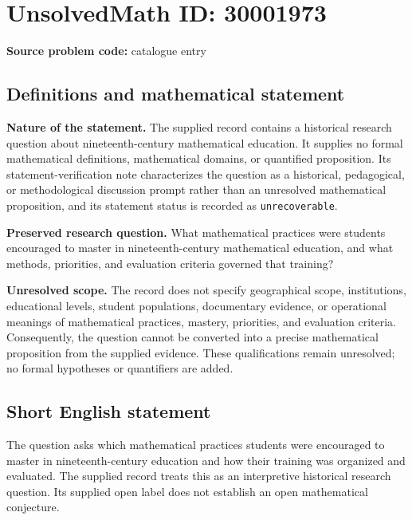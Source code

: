\documentclass[11pt]{article}
\begin{document}
\section*{UnsolvedMath ID: 30001973}
\textbf{Source problem code:} catalogue entry
\subsection{Definitions and mathematical statement}
\textbf{Nature of the statement.} The supplied record contains a historical research question about nineteenth-century mathematical education. It supplies no formal mathematical definitions, mathematical domains, or quantified proposition. Its statement-verification note characterizes the question as a historical, pedagogical, or methodological discussion prompt rather than an unresolved mathematical proposition, and its statement status is recorded as \texttt{unrecoverable}.

\textbf{Preserved research question.} What mathematical practices were students encouraged to master in nineteenth-century mathematical education, and what methods, priorities, and evaluation criteria governed that training?

\textbf{Unresolved scope.} The record does not specify geographical scope, institutions, educational levels, student populations, documentary evidence, or operational meanings of mathematical practices, mastery, priorities, and evaluation criteria. Consequently, the question cannot be converted into a precise mathematical proposition from the supplied evidence. These qualifications remain unresolved; no formal hypotheses or quantifiers are added.
\subsection{Short English statement}
The question asks which mathematical practices students were encouraged to master in nineteenth-century education and how their training was organized and evaluated. The supplied record treats this as an interpretive historical research question. Its supplied open label does not establish an open mathematical conjecture.
\end{document}
